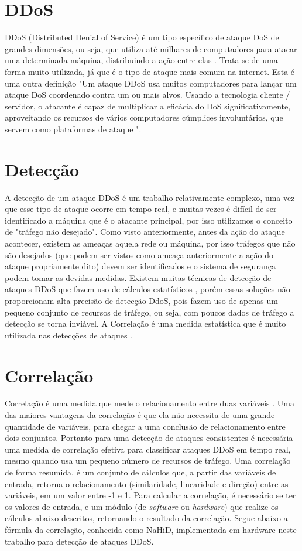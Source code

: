 \section{DDoS}
DDoS (Distributed Denial of Service) é um tipo específico de ataque DoS de grandes dimensões, ou seja, que utiliza até milhares de computadores para atacar uma determinada máquina, distribuindo a ação entre elas \cite{alecrim2008ataques}. Trata-se de uma forma muito utilizada, já que é o tipo de ataque mais comum na internet. Esta é uma outra definição\: "Um ataque DDoS usa muitos computadores para lançar um ataque DoS coordenado contra um ou mais alvos. Usando a tecnologia cliente / servidor, o atacante é capaz de multiplicar a eficácia do DoS significativamente, aproveitando os recursos de vários computadores cúmplices involuntários, que servem como plataformas de ataque "\cite{stein2002world}.

\section{Detecção}
A detecção de um ataque DDoS é um trabalho relativamente complexo, uma vez que esse tipo de ataque ocorre em tempo real, e muitas vezes é difícil de ser identificado a máquina que é o atacante principal, por isso utilizamos o conceito de "tráfego não desejado". Como visto anteriormente, antes da ação do ataque acontecer, existem as ameaças aquela rede ou máquina, por isso tráfegos que não são desejados (que podem ser vistos como ameaça anteriormente a ação do ataque propriamente dito) devem ser identificados e o sistema de segurança podem tomar as devidas medidas. Existem muitas técnicas de detecção de ataques DDoS que fazem uso de cálculos estatísticos \cite{6814272}, porém essas soluções não proporcionam alta precisão de detecção DdoS, pois fazem uso de apenas um pequeno conjunto de recursos de tráfego, ou seja, com poucos dados de tráfego a detecção se torna inviável. A Correlação é uma medida estatística que é muito utilizada nas detecções de ataques \cite{yu2012discriminating}.

\section{Correlação}

Correlação é uma medida que mede o relacionamento entre duas variáveis .  Uma das maiores vantagens da correlação é que ela não necessita de uma grande quantidade de variáveis, para chegar a uma conclusão de relacionamento entre dois conjuntos. Portanto para uma detecção de ataques consistentes é necessária uma medida de correlação efetiva para classificar ataques DDoS  em tempo real, mesmo quando usa um pequeno número de recursos de tráfego. Uma correlação de forma resumida, é um conjunto de cálculos que, a partir das variáveis de entrada, retorna o relacionamento (similaridade, linearidade e direção) entre as variáveis, em um valor entre -1 e 1. Para calcular a correlação, é necessário se ter os valores de entrada, e um módulo (de \textit{software} ou \textit{hardware}) que realize os  cálculos abaixo descritos, retornando o resultado da correlação. Segue abaixo a fórmula da correlação, conhecida como NaHiD, implementada em hardware neste trabalho para detecção de ataques DDoS.

